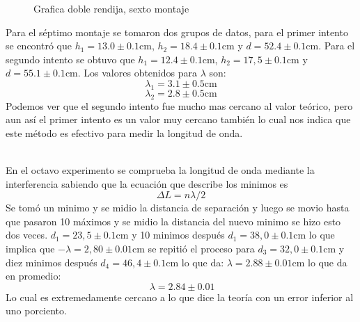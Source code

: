 \documentclass[aps,prl,reprint]{revtex4-1}
\begin{document}
\begin{figure}[H]
\begin{center}
 \caption{Grafica doble rendija, sexto montaje}
 \label{grmonta6}
 \end{center}
\end{figure}

Para el séptimo montaje se tomaron dos grupos de datos, para el primer intento se encontró que $h_1=13.0\pm 0.1 \text{cm}$, $h_2=18.4\pm 0.1 \text{cm}$ y $d=52.4\pm 0.1 \text{cm}$. Para el segundo intento se obtuvo que $h_1=12.4\pm 0.1 \text{cm}$, $h_2=17,5\pm 0.1 \text{cm}$ y $d=55.1\pm 0.1 \text{cm}$. Los valores obtenidos para $\lambda$ son:
\begin{equation*}
    \lambda_1 = 3.1 \pm 0.5 \text{cm}
\end{equation*}
\begin{equation*}
    \lambda_2 = 2.8 \pm 0.5 \text{cm}
\end{equation*}
Podemos ver que el segundo intento fue mucho mas cercano al valor teórico, pero aun así el primer intento es un valor muy cercano también lo cual nos indica que este método es efectivo para medir la longitud de onda.

\\
 En el octavo experimento se comprueba la longitud de onda mediante la interferencia sabiendo que la ecuación que describe los minimos es
 \begin{equation*}
    \Delta L = n \lambda /2
    \end{equation*}
    Se tomó un minimo y se midio la distancia de separación y luego se movio hasta que pasaron 10 máximos y se midio la distancia del nuevo minimo se hizo esto dos veces.
    $d_1=23,5\pm 0.1 \text{cm}$ y 10 minimos después $d_1=38,0\pm 0.1 \text{cm}$  lo que implica que $-\lambda = 2,80\pm 0.01 \text{cm}$ se repitió el proceso para $d_3=32,0\pm 0.1 \text{cm}$ y diez minimos después $d_4=46,4\pm 0.1 \text{cm}$ lo que da: $\lambda =2.88\pm 0.01 \text{cm}$ lo que da en promedio: \begin{equation*}
    \ \lambda =2.84\pm 0.01
    \end{equation*}
    Lo cual es extremedamente cercano a lo que dice la teoría con un error inferior al uno porciento.
\end{document}

